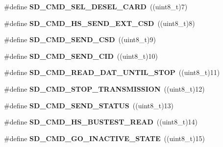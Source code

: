 \begin{DoxyCompactItemize}
\item 
\#define {\bfseries S\+D\+\_\+\+C\+M\+D\+\_\+\+S\+E\+L\+\_\+\+D\+E\+S\+E\+L\+\_\+\+C\+A\+RD}~((uint8\+\_\+t)7)\hypertarget{group__sd__card_gaf049767ff08cf35fcddef8f413964050}{}\label{group__sd__card_gaf049767ff08cf35fcddef8f413964050}

\item 
\#define {\bfseries S\+D\+\_\+\+C\+M\+D\+\_\+\+H\+S\+\_\+\+S\+E\+N\+D\+\_\+\+E\+X\+T\+\_\+\+C\+SD}~((uint8\+\_\+t)8)\hypertarget{group__sd__card_gaeea3a373a0065cab0080a56395bc5a19}{}\label{group__sd__card_gaeea3a373a0065cab0080a56395bc5a19}

\item 
\#define {\bfseries S\+D\+\_\+\+C\+M\+D\+\_\+\+S\+E\+N\+D\+\_\+\+C\+SD}~((uint8\+\_\+t)9)\hypertarget{group__sd__card_gaffe6f096eefb62711d4ba298c4598e2e}{}\label{group__sd__card_gaffe6f096eefb62711d4ba298c4598e2e}

\item 
\#define {\bfseries S\+D\+\_\+\+C\+M\+D\+\_\+\+S\+E\+N\+D\+\_\+\+C\+ID}~((uint8\+\_\+t)10)\hypertarget{group__sd__card_gad0df99cd4f523813b603109db94f07c6}{}\label{group__sd__card_gad0df99cd4f523813b603109db94f07c6}

\item 
\#define {\bfseries S\+D\+\_\+\+C\+M\+D\+\_\+\+R\+E\+A\+D\+\_\+\+D\+A\+T\+\_\+\+U\+N\+T\+I\+L\+\_\+\+S\+T\+OP}~((uint8\+\_\+t)11)\hypertarget{group__sd__card_gacf2a1a56e95b0b5ebeca09a38c9538e7}{}\label{group__sd__card_gacf2a1a56e95b0b5ebeca09a38c9538e7}

\item 
\#define {\bfseries S\+D\+\_\+\+C\+M\+D\+\_\+\+S\+T\+O\+P\+\_\+\+T\+R\+A\+N\+S\+M\+I\+S\+S\+I\+ON}~((uint8\+\_\+t)12)\hypertarget{group__sd__card_ga45a924a12fc702bebac386ed429a60ff}{}\label{group__sd__card_ga45a924a12fc702bebac386ed429a60ff}

\item 
\#define {\bfseries S\+D\+\_\+\+C\+M\+D\+\_\+\+S\+E\+N\+D\+\_\+\+S\+T\+A\+T\+US}~((uint8\+\_\+t)13)\hypertarget{group__sd__card_ga4d58ed74fb20e34fb557fa97c1935fe3}{}\label{group__sd__card_ga4d58ed74fb20e34fb557fa97c1935fe3}

\item 
\#define {\bfseries S\+D\+\_\+\+C\+M\+D\+\_\+\+H\+S\+\_\+\+B\+U\+S\+T\+E\+S\+T\+\_\+\+R\+E\+AD}~((uint8\+\_\+t)14)\hypertarget{group__sd__card_ga4dbc2cc034c8f582602063be358ad160}{}\label{group__sd__card_ga4dbc2cc034c8f582602063be358ad160}

\item 
\#define {\bfseries S\+D\+\_\+\+C\+M\+D\+\_\+\+G\+O\+\_\+\+I\+N\+A\+C\+T\+I\+V\+E\+\_\+\+S\+T\+A\+TE}~((uint8\+\_\+t)15)\hypertarget{group__sd__card_gab8adaf3188d195b83ba32a9e72863072}{}\label{group__sd__card_gab8adaf3188d195b83ba32a9e72863072}


\end{DoxyCompactItemize}
